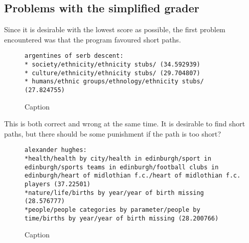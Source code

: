 \subsection{Problems with the simplified grader}
Since it is desirable with the lowest score as possible, the first problem encountered was that the program favoured short paths. 

\begin{figure}
\centering
\begin{lstlisting}
argentines of serb descent:
* society/ethnicity/ethnicity stubs/ (34.592939)
* culture/ethnicity/ethnicity stubs/ (29.704807)
* humans/ethnic groups/ethnology/ethnicity stubs/ (27.824755)
\end{lstlisting}
\caption{Caption}
\label{fig:my_label}
\end{figure}

This is both correct and wrong at the same time. It is desirable to find short paths, but there should be some punishment if the path is too short?

\begin{comment}
Problem med Alexander Huges: han er fotballspiller og dette kommer ikke så godt fra. 

asd.,kas.kdfj
\end{comment}


\begin{figure}[h]
\centering
\begin{lstlisting}
alexander hughes:
*health/health by city/health in edinburgh/sport in edinburgh/sports teams in edinburgh/football clubs in edinburgh/heart of midlothian f.c./heart of midlothian f.c. players (37.22501)
*nature/life/births by year/year of birth missing (28.576777)
*people/people categories by parameter/people by time/births by year/year of birth missing (28.200766)
\end{lstlisting}

\caption{Caption}
\label{fig:alexanderhughes}
\end{figure}
